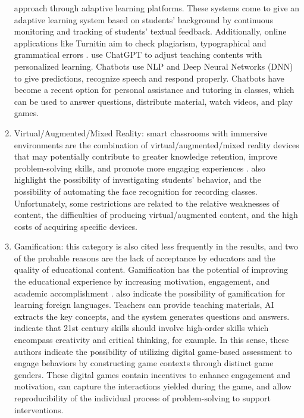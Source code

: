 \documentclass[english]{textolivre}
\begin{document}
\begin{enumerate}
approach through adaptive learning platforms. These systems come to give
an adaptive learning system based on students' background by continuous
monitoring and tracking of students' textual feedback. Additionally,
online applications like Turnitin aim to check plagiarism, typographical
and grammatical errors \cite{Shaik2022}. \textcite{Tang2023} use ChatGPT
to adjust teaching contents with personalized learning. Chatbots use NLP
and Deep Neural Networks (DNN) to give predictions, recognize speech and
respond properly. Chatbots have become a recent option for personal
assistance and tutoring in classes, which can be used to answer
questions, distribute material, watch videos, and play games.
  \item Virtual/Augmented/Mixed Reality: smart classrooms with immersive
  environments are the combination of virtual/augmented/mixed reality
  devices that may potentially contribute to greater knowledge
  retention, improve problem-solving skills, and promote more engaging
  experiences \cite{Dimitriadou2022}. \textcite{Zhang2021} also
  highlight the possibility of investigating students' behavior, and
  \textcite{Haghighi2021} the possibility of automating the face
  recognition for recording classes. Unfortunately, some restrictions
  are related to the relative weaknesses of content, the difficulties of
  producing virtual/augmented content, and the high costs of acquiring
  specific devices.

  \item Gamification: this category is also cited less frequently in the
  results, and two of the probable reasons are the lack of acceptance by
  educators and the quality of educational content. Gamification has the
  potential of improving the educational experience by increasing
  motivation, engagement, and academic accomplishment
  \cite{Dahalan2024}. \textcite{Syzdykbayeva2021}
  also indicate the possibility of gamification for learning foreign
  languages. Teachers can provide teaching materials, AI extracts the
  key concepts, and the system generates questions and answers. \textcite{Zhu2023} indicate that 21st century skills should involve
  high-order skills which encompass creativity and critical thinking,
  for example. In this sense, these authors indicate the possibility of
  utilizing digital game-based assessment to engage behaviors by
  constructing game contexts through distinct game genders. These
  digital games contain incentives to enhance engagement and motivation,
  can capture the interactions yielded during the game, and allow
  reproducibility of the individual process of problem-solving to
  support interventions.


\end{enumerate}
\end{document}
